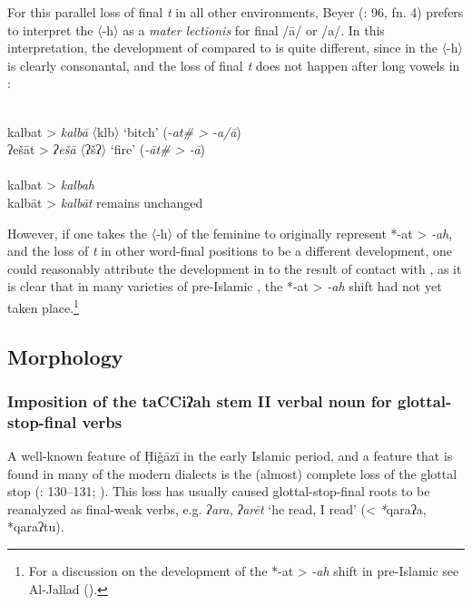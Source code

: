 \documentclass[output=paper]{langsci/langscibook}
\begin{document}
For this parallel loss of final \textit{t} in all other environments, Beyer (\citeyear{Beyer1984}: 96, fn. 4) prefers to interpret the 〈-h〉 as a \textit{mater} \textit{lectionis} for final /ā/ or /a/. In this interpretation, the development of  compared to  is quite different, since in  the 〈-h〉 is clearly consonantal, and the loss of final \textit{t} does not happen after long vowels in :


 \\
\ea *kalbat > \textit{kalbā} 〈klb〉 ‘bitch’ (\textit{-at\# > -a/ā})\\
\ex *ʔešāt > \textit{ʔešā}   〈ʔšʔ〉 ‘fire’ (\textit{-āt\# > -ā})\\
\z
{} \\
\ea *kalbat > \textit{kalbah}\\
\ex *kalbāt > \textit{kalbāt} remains unchanged \\
\z
\z

However, if one takes the 〈-h〉 of the feminine to originally represent *-at > \textit{-ah}, and the loss of \textit{t} in other word-final positions to be a different development, one could reasonably attribute the development in  to the result of contact with , as it is clear that in many varieties of pre-Islamic , the *-at > \textit{-ah} shift had not yet taken place.\footnote{For a discussion on the development of the *-at > \textit{-ah} shift in pre-Islamic  see Al-Jallad (\citeyear[157--158]{Al-Jallad2017Greek}).}

\subsection{\label{bkm:Ref13577493}Morphology}
\subsubsection{\label{bkm:Ref13224791}Imposition of the taCCiʔah stem II verbal noun for glottal-stop-final verbs}

A well-known feature of Ḥiǧāzī  in the early Islamic period, and a feature that is found in many of the modern dialects is the (almost) complete loss of the glottal stop (\citealt{Rabin1951}: 130--131; \citealt{vanPutten2018}). This loss has usually caused glottal-stop-final {roots} to be reanalyzed as final-weak verbs, e.g.  \textit{ʔara,} \textit{ʔarēt} ‘he read, I read’ (< \textit{*}qaraʔa, *qaraʔtu).
\end{document}
